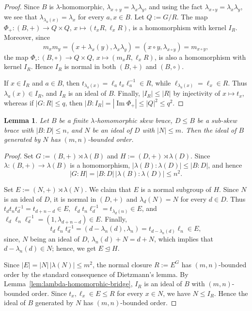 \documentclass[11pt, oneside]{amsart}
\numberwithin{equation}{section}
\theoremstyle{plain}
\newtheorem{lem}[equation]{Lemma}
\theoremstyle{definition}
\begin{document}
\begin{proof}
Since $B$ is $\lambda$-homomorphic, $\lambda_{x+y}=\lambda_x\lambda_y$, and using the fact  $\lambda_{x\circ y}=\lambda_x\lambda_y$, we see that $\lambda_{\lambda_a(x)}=\lambda_x$  for every $a, x\in B$.
Let $Q:=G/R$. The map $\Phi_+:(B,+)\to Q\times Q$, $x\mapsto(t_xR,\ell_xR)$, is a homomorphism with kernel $I_R$. Moreover, since
$$
m_xm_y=(x+\lambda_x(y),\lambda_x\lambda_y)=(x\circ y,\lambda_{x\circ y})=m_{x\circ y},
$$
the map $\Phi_\circ:(B,\circ)\to Q\times Q$, $x\mapsto(m_xR,\ell_xR)$, is also a homomorphism with kernel $I_R$. Hence $I_R$ is normal in both $(B,+)$ and $(B,\circ)$.

If $x\in I_R$ and $a\in B$, then $t_{\lambda_a(x)}=\ell_at_x\ell_a^{-1}\in R$, while $\ell_{\lambda_a(x)}=\ell_x\in R$. Thus $\lambda_a(x)\in I_R$, and $I_R$ is an ideal of $B$. Finally, $|I_R|\leqslant |R|$ by injectivity of $x\mapsto t_x$, whereas if $|G:R|\leqslant q$, then $|B:I_R|=|\operatorname{Im}\Phi_+|\leqslant |Q|^2\leqslant q^2$.
\end{proof}

\begin{lem}\label{lem:bounded-ideal-closure-lambda-homomorphic}
Let $B$ be a finite $\lambda$-homomorphic skew brace,  $D\leqslant B$ be a sub-skew brace with $|B:D|\leqslant n$, and $N$ be an ideal of $D$ with $|N|\leqslant m$. Then the ideal of $B$ generated by $N$ has $(m,n)$-bounded order.
\end{lem}

\begin{proof}
Set $G :=(B,+)\rtimes\lambda(B)$ and $H:=(D,+)\rtimes\lambda(D)$. Since $\lambda:(B,+)\to\lambda(B)$ is a homomorphism, $|\lambda(B):\lambda(D)|\leqslant |B:D|$, and hence
$$
|G:H|=|B:D|\,|\lambda(B):\lambda(D)|\leqslant n^2.
$$

Set $E:=(N,+)\rtimes\lambda(N)$. We claim that $E$ is a normal subgroup of $H$. Since $N$ is an ideal of $D$, it is normal in $(D,+)$ and $\lambda_d(N)=N$ for every $d\in D$. Thus $t_dt_nt_d^{-1}=t_{d+n-d}\in E$, $\ell_dt_n\ell_d^{-1}=t_{\lambda_d(n)}\in E$, and $\ell_d\ell_n\ell_d^{-1}=(1,\lambda_{d+n-d})\in E$. Finally,
$$
t_d\ell_nt_d^{-1}=(d-\lambda_n(d),\lambda_n)=t_{d-\lambda_n(d)}\ell_n\in E,
$$
since, $N$ being an ideal of $D$, $\lambda_n(d)+N=d+N$, which implies that  $d-\lambda_n(d)\in N$; hence, we get $E\unlhd H$.

Since $|E|=|N|\,|\lambda(N)|\leqslant m^2$, the normal closure $R:=E^G$ has $(m,n)$-bounded order by the standard consequence of Dietzmann's lemma. By Lemma~\ref{lem:lambda-homomorphic-bridge}, $I_R$ is an ideal of $B$ with $(m,n)$-bounded order. Since $t_x,\ell_x\in E\leqslant R$ for every $x\in N$, we have $N\leqslant I_R$. Hence the ideal of $B$ generated by $N$ has $(m,n)$-bounded order.
\end{proof}
\end{document}
